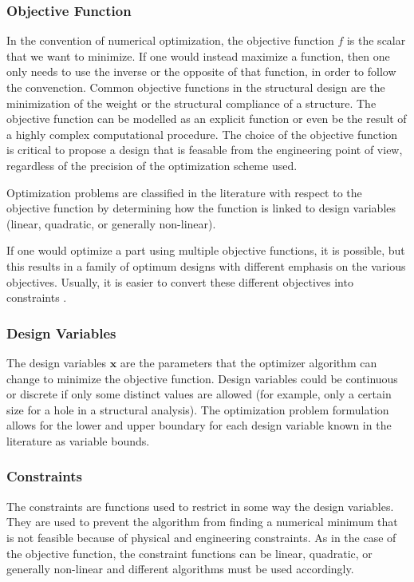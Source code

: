 \subsubsection{Objective Function}
In the convention of numerical optimization, the objective function $f$ is the scalar that we want to minimize. If one would instead maximize a function, then one only needs to use the inverse or the opposite of that function, in order to follow the convenction. Common objective functions in the structural design are the minimization of the weight or the structural compliance of a structure. The objective function can be modelled as an explicit function or even be the result of a highly complex computational procedure. The choice of the objective function is critical to propose a design that is feasable from the engineering point of view, regardless of the precision of the optimization scheme used.
 
Optimization problems are classified in the literature with respect to the objective function by determining how the function is linked to design variables (linear, quadratic, or generally non-linear).
 
If one would optimize a part using multiple objective functions, it is possible, but this results in a family of optimum designs with different emphasis on the various objectives. Usually, it is easier to convert these different objectives into constraints .

\subsubsection{Design Variables}
The design variables $\bm{x}$ are the parameters that the optimizer algorithm can change to minimize the objective function. Design variables could be continuous or discrete if only some distinct values are allowed (for example, only a certain size for a hole in a structural analysis). The optimization problem formulation allows for the lower and upper boundary for each design variable known in the literature as variable bounds.

\subsubsection{Constraints}
The constraints are functions used to restrict in some way the design variables. They are used to prevent the algorithm from finding a numerical minimum that is not feasible because of physical and engineering constraints. As in the case of the objective function, the constraint functions can be linear, quadratic, or generally non-linear and different algorithms must be used accordingly.
 
